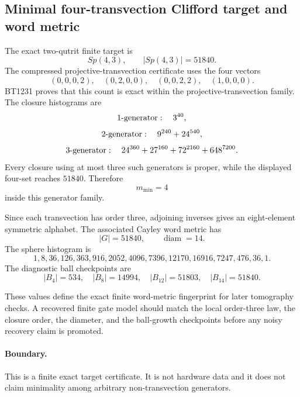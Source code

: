 \subsection{Minimal four-transvection Clifford target and word metric}
\label{sec:bt1236-minimal-clifford-word-metric}

The exact two-qutrit finite target is
\[
Sp(4,3),\qquad |Sp(4,3)|=51840.
\]
The compressed projective-transvection certificate uses the four vectors
\[
(0,0,0,2),\quad (0,2,0,0),\quad (0,0,2,2),\quad (1,0,0,0).
\]
BT1231 proves that this count is exact within the projective-transvection family.  The closure histograms are
\[
1\hbox{-generator}:\quad 3^{40},
\]
\[
2\hbox{-generator}:\quad 9^{240}+24^{540},
\]
\[
3\hbox{-generator}:\quad 24^{360}+27^{160}+72^{2160}+648^{7200}.
\]
Every closure using at most three such generators is proper, while the displayed four-set reaches \(51840\).  Therefore
\[
\boxed{m_{\min}=4}
\]
inside this generator family.

Since each transvection has order three, adjoining inverses gives an eight-element symmetric alphabet.  The associated Cayley word metric has
\[
\boxed{|G|=51840,\qquad \operatorname{diam}=14.}
\]
The sphere histogram is
\[
\boxed{1,8,36,126,363,916,2052,4096,7396,12170,16916,7247,476,36,1.}
\]
The diagnostic ball checkpoints are
\[
\boxed{|B_4|=534,\quad |B_8|=14994,\quad |B_{12}|=51803,\quad |B_{14}|=51840.}
\]

These values define the exact finite word-metric fingerprint for later tomography checks.  A recovered finite gate model should match the local order-three law, the closure order, the diameter, and the ball-growth checkpoints before any noisy recovery claim is promoted.

\paragraph{Boundary.}
This is a finite exact target certificate.  It is not hardware data and it does not claim minimality among arbitrary non-transvection generators.
